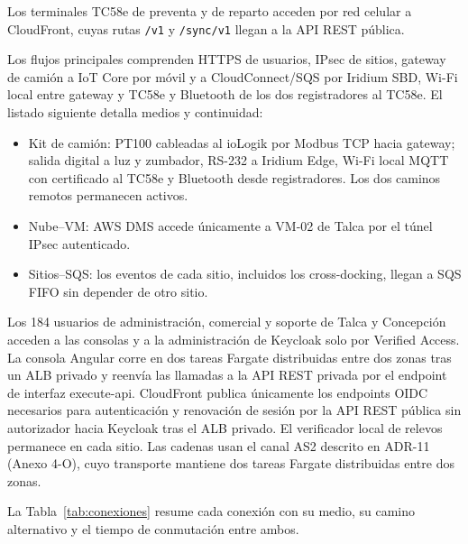 Los terminales TC58e de preventa y de reparto acceden por red celular a CloudFront, cuyas rutas \texttt{/v1} y \texttt{/sync/v1} llegan a la API REST pública.

Los flujos principales comprenden HTTPS de usuarios, IPsec de sitios, gateway de camión a IoT Core por móvil y a CloudConnect/SQS por Iridium SBD, Wi-Fi local entre gateway y TC58e y Bluetooth de los dos registradores al TC58e. El listado siguiente detalla medios y continuidad:

\begin{itemize}
  \item Kit de camión: PT100 cableadas al ioLogik por Modbus TCP hacia gateway; salida digital a luz y zumbador, RS-232 a Iridium Edge, Wi-Fi local MQTT con certificado al TC58e y Bluetooth desde registradores. Los dos caminos remotos permanecen activos.
  \item Nube--VM: AWS DMS accede únicamente a VM-02 de Talca por el túnel IPsec autenticado.
  \item Sitios--SQS: los eventos de cada sitio, incluidos los cross-docking, llegan a SQS FIFO sin depender de otro sitio.
\end{itemize}

Los 184 usuarios de administración, comercial y soporte de Talca y Concepción acceden a las consolas y a la administración de Keycloak solo por Verified Access. La consola Angular corre en dos tareas Fargate distribuidas entre dos zonas tras un ALB privado y reenvía las llamadas a la API REST privada por el endpoint de interfaz execute-api. CloudFront publica únicamente los endpoints OIDC necesarios para autenticación y renovación de sesión por la API REST pública sin autorizador hacia Keycloak tras el ALB privado. El verificador local de relevos permanece en cada sitio. Las cadenas usan el canal AS2 descrito en ADR-11 (Anexo 4-O), cuyo transporte mantiene dos tareas Fargate distribuidas entre dos zonas.

La Tabla~\ref{tab:conexiones} resume cada conexión con su medio, su camino alternativo y el tiempo de conmutación entre ambos.

